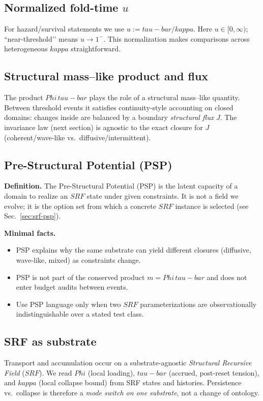 \documentclass[12pt]{article}
\newcommand{\FoldDensity}{\Phi}
\newcommand{\FoldTime}{\bar{\tau}}
\newcommand{\Threshold}{\kappa}
\newcommand{\SRF}{\mathcal{F}_{\mathrm{SR}}}
\def\FoldDensity{Phi}%
\def\FoldTime{tau-bar}%
\def\Threshold{kappa}%
\def\SRF{SRF}%
\def\bar#1{#1}%
\def\mathcal#1{#1}%
\def\mathrm#1{#1}%
\begin{document}
\subsection[Normalized fold-time (u)]{Normalized fold-time $u$}
For hazard/survival statements we use $u := \FoldTime/\Threshold$.
Here $u\in[0,\infty)$; “near-threshold’’ means $u\to 1^{-}$.
This normalization makes comparisons across heterogeneous $\Threshold$ straightforward.

\subsection{Structural mass--like product and flux}
The product $\FoldDensity\,\FoldTime$ plays the role of a structural mass--like quantity.
Between threshold events it satisfies continuity-style accounting on closed domains:
changes inside are balanced by a boundary \emph{structural flux} $J$.
The invariance law (next section) is agnostic to the exact closure for $J$ (coherent/wave-like vs.\ diffusive/intermittent).

\subsection{Pre-Structural Potential (PSP)}\label{sec:psp-core}
\textbf{Definition.} The Pre-Structural Potential (PSP) is the latent capacity of a domain to realize an $\SRF$ state under given constraints. It is not a field we evolve; it is the option set from which a concrete $\SRF$ instance is selected (see Sec.~\ref{sec:srf-psp}).

\textbf{Minimal facts.}
\begin{itemize}
  \item PSP explains why the same substrate can yield different closures (diffusive, wave-like, mixed) as constraints change.
  \item PSP is not part of the conserved product $m=\FoldDensity\,\FoldTime$ and does not enter budget audits between events.
  \item Use PSP language only when two $\SRF$ parameterizations are observationally indistinguishable over a stated test class.
\end{itemize}


\subsection{SRF as substrate}
Transport and accumulation occur on a substrate-agnostic \emph{Structural Recursive Field} ($\SRF$).
We read $\FoldDensity$ (local loading), $\FoldTime$ (accrued, post-reset tension), and $\Threshold$ (local collapse bound) from SRF states and histories.
Persistence vs.\ collapse is therefore a \emph{mode switch on one substrate}, not a change of ontology.
\end{document}
